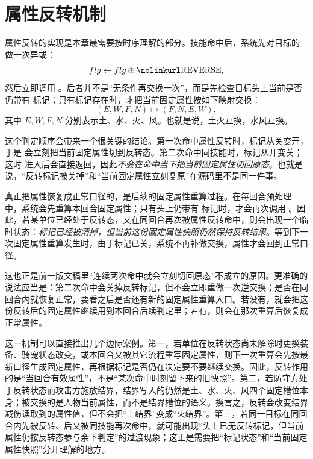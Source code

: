 \section{属性反转机制}

属性反转的实现是本章最需要按时序理解的部分。技能命中后，系统先对目标的  做一次异或：
\begin{equation}
    flg \leftarrow flg \oplus \code{REVERSE},
\end{equation}
然后立即调用 。后者并不是“无条件再交换一次”，而是先检查目标头上当前是否仍带有  标记；只有标记存在时，才把当前固定属性按如下映射交换：
\begin{equation}
    (E,W,F,N) \longmapsto (F,N,E,W),
    \label{eq:reverse-map}
\end{equation}
其中 $E,W,F,N$ 分别表示土、水、火、风。也就是说，土火互换，水风互换。

这个判定顺序会带来一个很关键的结论。第一次命中属性反转时，标记从关变开，于是  会立刻把当前固定属性切到反转态。第二次命中同技能时，标记从开变关；这时  进入后会直接返回，因此\emph{不会在命中当下把当前固定属性切回原态}。也就是说，“反转标记被关掉”和“当前固定属性立刻复原”在源码里不是同一件事。

真正把属性恢复成正常口径的，是后续的固定属性重算过程。在每回合预处理  中，系统会先重算本回合固定属性；只有头上仍带有  标记时，才会再次调用 。因此，若某单位已经处于反转态，又在同回合再次被属性反转命中，则会出现一个临时状态：\emph{标记已经被清掉，但当前这份固定属性快照仍然保持反转结果}。等到下一次固定属性重算发生时，由于标记已关，系统不再补做交换，属性才会回到正常口径。

这也正是前一版文稿里“连续两次命中就会立刻切回原态”不成立的原因。更准确的说法应当是：第二次命中会关掉反转标记，但不会立即重做一次逆交换；是否在同回合内就恢复正常，要看之后是否还有新的固定属性重算入口。若没有，就会把这份反转后的固定属性继续用到本回合后续判定里；若有，则会在那次重算后恢复成正常属性。

这一机制可以直接推出几个边际案例。第一，若单位在反转状态尚未解除时更换装备、骑宠状态改变，或本回合又被其它流程重写固定属性，则下一次重算会先按最新口径生成固定属性，再根据标记是否仍在决定要不要继续交换。因此，反转作用的是“当回合有效属性”，不是“某次命中时刻留下来的旧快照”。第二，若防守方处于反转状态而攻击方施放结界，结界写入的仍然是土、水、火、风四个固定槽位本身；被交换的是人物当前属性，而不是结界槽位的语义。换言之，反转会改变结界减伤读取到的属性值，但不会把“土结界”变成“火结界”。第三，若同一目标在同回合内先被反转、后又被同技能再次命中，就可能出现“头上已无反转标记，但当前属性仍按反转态参与余下判定”的过渡现象；这正是需要把“标记状态”和“当前固定属性快照”分开理解的地方。

